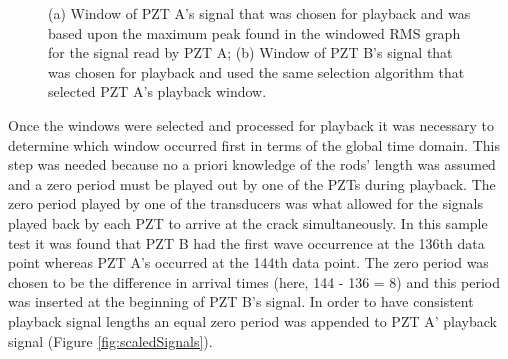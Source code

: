\begin{figure}
\begin{subfigmatrix}{2}
\end{subfigmatrix}

  \caption
  { \label{fig:chosenSignals}
(a) Window of PZT A's signal that was chosen for playback and was based upon the maximum peak found in the windowed RMS graph for the signal read by PZT A;
(b) Window of PZT B's signal that was chosen for playback and used the same selection algorithm that selected PZT A's playback window.
}
\end{figure}

Once the windows were selected and processed for playback it was necessary to determine which window occurred first in terms of the global time domain. This step was needed because no a priori knowledge of the rods' length was assumed and a zero period must be played out by one of the PZTs during playback. The zero period played by one of the transducers was what allowed for the signals played back by each PZT to arrive at the crack simultaneously. In this sample test it was found that PZT B had the first wave occurrence at the 136th data point whereas PZT A's occurred at the 144th data point.  The zero period was chosen to be the difference in arrival times (here, 144 - 136 = 8) and this period was inserted at the beginning of PZT B's signal. In order to have consistent playback signal lengths an equal zero period was appended to PZT A' playback signal (Figure \ref{fig:scaledSignals}).


